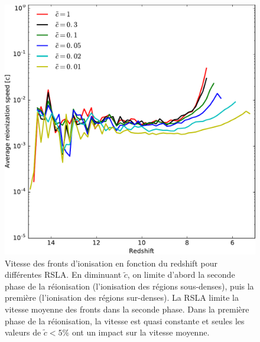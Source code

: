 %


\begin{figure}
\centering
		\includegraphics[width=.9\linewidth]{img/04_mapreio/avg_reionization_speed.pdf} 
        \caption[Évolution de la vitesse moyenne des fronts]{Vitesse des fronts d'ionisation en fonction du redshift pour différentes \ac{RSLA}.
        En diminuant $\tilde{c}$, on limite d'abord la seconde phase de la réionisation (l'ionisation des régions sous-denses), puis la première (l'ionisation des régions sur-denses).
        La \ac{RSLA} limite la vitesse moyenne des fronts dans la seconde phase.
        Dans la première phase de la réionisation, la vitesse est quasi constante et seules les valeurs de $\tilde{c} < 5\% $ ont un impact sur la vitesse moyenne.
        }        
 		\label{fig:vreioz_avg}
\end{figure}



